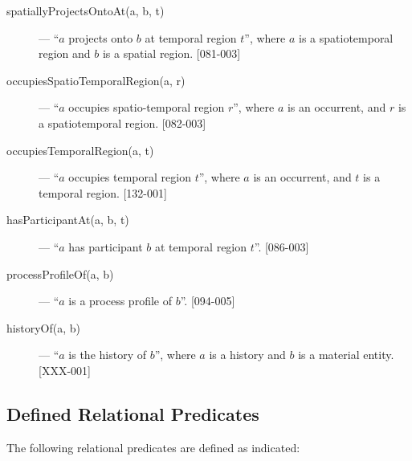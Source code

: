 \documentclass{article}
\begin{document}
\begin{description}
\item[spatiallyProjectsOntoAt(a, b, t)] --- ``$a$ projects onto $b$ at temporal region $t$'', where $a$ is a spatiotemporal region and $b$ is a spatial region. [081-003]

\item[occupiesSpatioTemporalRegion(a, r)] --- ``$a$ occupies spatio-temporal region $r$'', where $a$ is an occurrent, and $r$ is a spatiotemporal region. [082-003]

\item[occupiesTemporalRegion(a, t)] --- ``$a$ occupies temporal region $t$'', where $a$ is an occurrent, and $t$ is a temporal region. [132-001]

\item[hasParticipantAt(a, b, t)] --- ``$a$ has participant $b$ at temporal region $t$''. [086-003]

\item[processProfileOf(a, b)] --- ``$a$ is a process profile of $b$''. [094-005]

\item[historyOf(a, b)] --- ``$a$ is the history of $b$'', where $a$ is a history and $b$ is a material entity. [XXX-001]

\end{description}






\subsection{Defined Relational Predicates}

The following relational predicates are defined as indicated:
\end{document}

